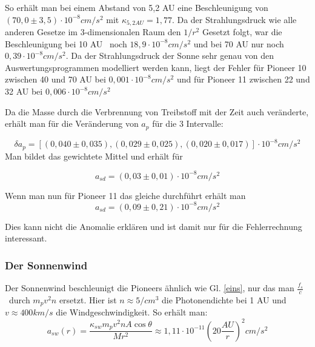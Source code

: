 \bigskip

So erh\"alt man bei einem Abstand von 5,2 AU eine Beschleunigung von 
$(70,0\pm 3,5)\cdot 10^{-8}\mathit{cm}/s^{2}$ mit $\kappa_{5,2 AU}=1,77$.
Da der Strahlungsdruck wie alle anderen
Gesetze im 3-dimensionalen Raum den  $1/r^{2}$ Gesetzt folgt, war die
Beschleunigung bei 10 AU \ noch  $18,9\cdot 10^{-8}\mathit{cm}/s^{2}$
und bei 70 AU nur noch  $0,39\cdot 10^{-8}\mathit{cm}/s^{2}$. Da der
Strahlungsdruck der Sonne sehr genau von den Auswertungsprogrammen
modelliert werden kann, liegt der Fehler f\"ur Pioneer 10 zwischen 40
und 70 AU bei  $0,001\cdot 10^{-8}\mathit{cm}/s^{2}$ und f\"ur Pioneer
11 zwischen 22 und 32 AU bei  $0,006\cdot 10^{-8}\mathit{cm}/s^{2}$

Da die Masse durch die Verbrennung von Treibstoff mit der Zeit auch
ver\"anderte, erh\"alt man f\"ur die Ver\"anderung von  $a_{p}$ f\"ur
die 3 Intervalle\cite{Anderson2002}:

\begin{equation}
\mathit{\delta a}_{p}=[(0,040\pm 0,035),(0,029\pm 0,025),(0,020\pm
0,017)]\cdot 10^{-8}\mathit{cm}/s^{2}
\end{equation}
Man bildet das gewichtete Mittel und erh\"alt f\"ur 

\begin{equation}
a_{\mathit{sd}}=(0,03\pm 0,01)\cdot 10^{-8}\mathit{cm}/s^{2}
\end{equation}

Wenn man nun f\"ur Pioneer 11 das gleiche durchf\"uhrt erh\"alt man 
\begin{equation}
a_{\mathit{sd}}=(0,09\pm 0,21)\cdot 10^{-8}\mathit{cm}/s^{2}
\end{equation}

Dies kann nicht die Anomalie erkl\"aren und ist damit nur f\"ur die
Fehlerrechnung interessant.


\bigskip

\subsubsection{Der Sonnenwind}

Der Sonnenwind beschleunigt die Pioneers \"ahnlich wie Gl. \ref{eins}, nur das
man  $\frac{f_{s}}{c}$ \ durch  $m_{p}v^{2}n$ ersetzt. Hier ist 
$n{\approx}5/\mathit{cm}^{3}$ die Photonendichte bei 1 AU und 
$v{\approx}400\mathit{km}/s$ die Windgeschwindigkeit. So erh\"alt
man\cite{Anderson2002}:
\begin{equation}
a_{\mathit{sw}}(r)=\frac{\kappa _{\mathit{sw}}m_{p}v^{2}nA\cos \theta
}{Mr^{2}}\approx 1,11\cdot
10^{-11}(20\frac{\mathit{AU}}{r})^{2}\mathit{cm}/s^{2}
\end{equation}

